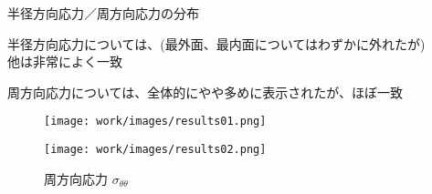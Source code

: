 \begin{frame}{半径方向応力／周方向応力の分布}
 
  半径方向応力については、(最外面、最内面についてはわずかに外れたが) \\
  他は非常によく一致

  周方向応力については、全体的にやや多めに表示されたが、ほぼ一致　
\begin{figure}[htbp]
\centering
  \begin{minipage}{0.49\columnwidth}
     \centering
     \texttt{[image: work/images/results01.png]}
     \caption{半径方向応力
       \begin{math}
         σ_{rr}
       \end{math}
     }
     \label{fig:hidari}
  \end{minipage}
%
  \begin{minipage}{0.49\columnwidth}
     \centering
     \texttt{[image: work/images/results02.png]}
     \caption{周方向応力
       \begin{math}
         σ_{\theta\theta}
       \end{math}
     }
     \label{fig:migi}
  \end{minipage}
\end{figure}

\end{frame}
